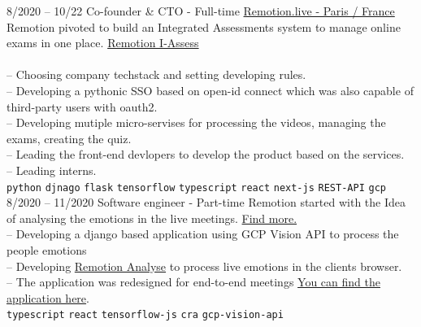\documentclass[9pt]{developercv}
\begin{document}
\begin{entrylist}
	\entry
	{8/2020 -- 10/22}
	{Co-founder \& CTO - Full-time}
	{\href{https://remotion.live/}{Remotion.live - Paris / France }}
	{Remotion pivoted to build an Integrated Assessments system to manage online exams in one place.
		\href{https://remotion.live/} {Remotion I-Assess} \\\\
		-- Choosing company techstack and setting developing rules. \\
		-- Developing a pythonic SSO based on open-id connect which was also capable of third-party users with oauth2. \\
		-- Developing mutiple micro-servises for processing the videos, managing the exams, creating the quiz. \\
		-- Leading the front-end devlopers to develop the product based on the services. \\
		-- Leading interns. \\
		\texttt{python}\slashsep
		\texttt{djnago}\slashsep
		\texttt{flask}\slashsep
		\texttt{tensorflow}\slashsep
		\texttt{typescript}\slashsep
		\texttt{react}\slashsep
		\texttt{next-js}\slashsep
		\texttt{REST-API}\slashsep
		\texttt{gcp}\slashsep
	}
	\entry
	{8/2020 -- 11/2020}
	{Software engineer - Part-time}
	{}
	{Remotion started with the Idea of analysing the emotions in the live meetings.
		\href{https://remotion.live/} {Find more.} \\
		-- Developing a django based application using GCP Vision API to process the people emotions \\
		-- Developing \href{https://analyse.remotion.live/} {Remotion Analyse} to process live emotions in the clients browser. \\
		-- The application was redesigned for end-to-end meetings \href{https://radious.fr/} {\space You can find the application here}. \\
		\texttt{typescript}\slashsep
		\texttt{react}\slashsep
		\texttt{tensorflow-js}\slashsep
		\texttt{cra}\slashsep
		\texttt{gcp-vision-api}\slashsep
	}


\end{entrylist}
\end{document}
